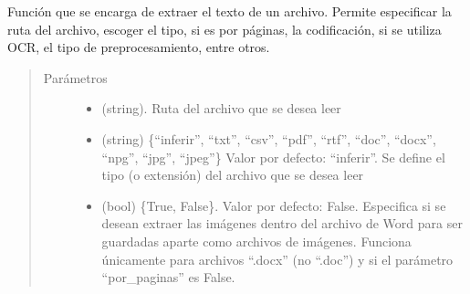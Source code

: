 \documentclass[letterpaper,10pt,openany,spanish]{sphinxmanual}
\begin{document}
\begin{fulllineitems}
\label{\detokenize{funciones/lectura:lectura.leer_texto}}
Función que se encarga de extraer el texto de un archivo. Permite especificar la ruta del archivo,         escoger el tipo, si es por páginas, la codificación, si se utiliza OCR, el tipo de preprocesamiento, entre otros.
\begin{quote}\begin{description}
\item[{Parámetros}] \leavevmode\begin{itemize}
\item {} 
 \textendash{} (string). Ruta del archivo que se desea leer

\item {} 
 \textendash{} (string) \{“inferir”, “txt”, “csv”, “pdf”, “rtf”, “doc”, “docx”, “npg”,         “jpg”, “jpeg”\} Valor por defecto: “inferir”. Se define el tipo (o extensión) del         archivo que se desea leer

\item {} 
 \textendash{} (bool) \{True, False\}. Valor por defecto: False. Especifica si se desean extraer las         imágenes dentro del archivo de Word para ser guardadas aparte como archivos         de imágenes. Funciona únicamente para archivos “.docx” (no “.doc”) y si el         parámetro “por\_paginas” es False.


\end{itemize}
\end{description}
\end{quote}
\end{fulllineitems}
\end{document}
